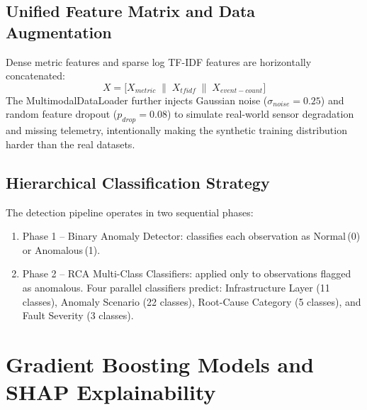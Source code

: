 \documentclass[5p, times]{elsarticle}
\begin{document}
\subsection{Unified Feature Matrix and Data Augmentation}
Dense metric features and sparse log TF-IDF features are horizontally concatenated:
\begin{equation}
    X = \bigl[X_{metric} \;\|\;
    X_{tfidf} \;\|\;
    X_{event-count}\bigr]
\end{equation}
The MultimodalDataLoader further injects Gaussian noise ($\sigma_{noise} = 0.25$) and random feature dropout ($p_{drop} = 0.08$) to simulate real-world sensor degradation and missing telemetry, intentionally making the synthetic training distribution harder than the real datasets.

\subsection{Hierarchical Classification Strategy}
The detection pipeline operates in two sequential phases:
\begin{enumerate}[leftmargin=*, topsep=2pt, itemsep=1pt]
    \item Phase 1 -- Binary Anomaly Detector: classifies each observation as Normal\,(0) or Anomalous\,(1).
    \item Phase 2 -- RCA Multi-Class Classifiers: applied only to observations flagged as anomalous. Four parallel classifiers predict: Infrastructure Layer (11 classes), Anomaly
    Scenario (22 classes), Root-Cause Category (5 classes), and Fault Severity (3 classes).
\end{enumerate}

\section{Gradient Boosting Models and SHAP Explainability}\label{sec5}
\end{document}
